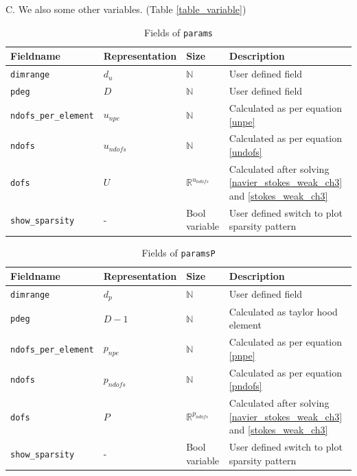 \documentclass[a4paper]{book}
\begin{document}
C. We also some other variables. (Table \ref{table_variable})\\
\newpage
\begin{table}[H]
\cprotect\caption{Fields of \verb|params|}
\label{table_params}
\begin{center}
\begin{tabular}{| p{}| p{} |  p{} | p{}|} 
\hline
\textbf{Fieldname} & \textbf{Representation} & \textbf{Size} & \textbf{Description}\\
\hline
\verb|dimrange| & $d_u$ & $\mathbb{N}$ & User defined field\\
\hline
\verb|pdeg| & $D$ & $\mathbb{N}$ & User defined field\\
\hline
\verb|ndofs_per_element| & $u_{npe}$ & $\mathbb{N}$ & Calculated as per equation \ref{unpe}\\
\hline
\verb|ndofs| & $u_{ndofs}$ & $\mathbb{N}$ & Calculated as per equation \ref{undofs}\\
\hline
\verb|dofs| & $U$ & $\mathbb{R}^{u_{ndofs}}$ & Calculated after solving \ref{navier_stokes_weak_ch3} and \ref{stokes_weak_ch3}\\
\hline
\verb|show_sparsity| & - & Bool variable & User defined switch to plot sparsity pattern\\
\hline
\end{tabular}
\end{center}
\end{table}

\begin{table}[H]
\cprotect\caption{Fields of \verb|paramsP|}
\label{table_paramsP}
\begin{center}
\begin{tabular}{| p{}| p{} |  p{} | p{}|}
\hline
\textbf{Fieldname} & \textbf{Representation} & \textbf{Size} & \textbf{Description}\\
\hline
\verb|dimrange| & $d_p$ & $\mathbb{N}$ & User defined field\\
\hline
\verb|pdeg| & $D-1$ & $\mathbb{N}$ & Calculated as taylor hood element\\
\hline
\verb|ndofs_per_element| & $p_{npe}$ & $\mathbb{N}$ & Calculated as per equation \ref{pnpe}\\
\hline
\verb|ndofs| & $p_{ndofs}$ & $\mathbb{N}$ & Calculated as per equation \ref{pndofs}\\
\hline
\verb|dofs| & $P$ & $\mathbb{R}^{p_{ndofs}}$ & Calculated after solving \ref{navier_stokes_weak_ch3} and \ref{stokes_weak_ch3}\\
\hline
\verb|show_sparsity| & - & Bool variable & User defined switch to plot sparsity pattern\\
\hline
\end{tabular}
\end{center}
\end{table}
\end{document}

